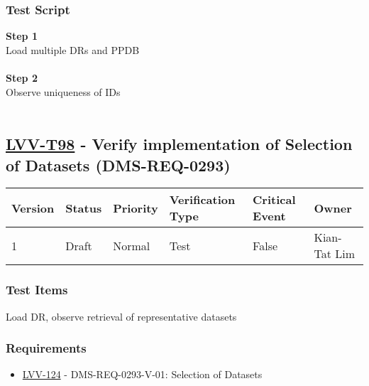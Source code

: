 \hypertarget{test-script-187}{%
\subsubsection{Test Script}\label{test-script-187}}

\textbf{Step 1}\\
Load multiple DRs and PPDB\\
~\\
\textbf{Step 2}\\
Observe uniqueness of IDs\\
~\\

\hypertarget{lvv-t98---verify-implementation-of-selection-of-datasets-dms-req-0293}{%
\subsection{\texorpdfstring{\href{https://jira.lsstcorp.org/secure/Tests.jspa\#/testCase/LVV-T98}{LVV-T98}
- Verify implementation of Selection of Datasets
(DMS-REQ-0293)}{LVV-T98 - Verify implementation of Selection of Datasets (DMS-REQ-0293)}}\label{lvv-t98---verify-implementation-of-selection-of-datasets-dms-req-0293}}

\begin{longtable}[]{@{}llllll@{}}
\toprule
Version & Status & Priority & Verification Type & Critical Event &
Owner\tabularnewline
\midrule
\endhead
1 & Draft & Normal & Test & False & Kian-Tat Lim\tabularnewline
\bottomrule
\end{longtable}

\hypertarget{test-items-187}{%
\subsubsection{Test Items}\label{test-items-187}}

Load DR, observe retrieval of representative datasets

\hypertarget{requirements-188}{%
\subsubsection{Requirements}\label{requirements-188}}

\begin{itemize}
\tightlist
\item
  \href{https://jira.lsstcorp.org/browse/LVV-124}{LVV-124} -
  DMS-REQ-0293-V-01: Selection of Datasets
\end{itemize}

